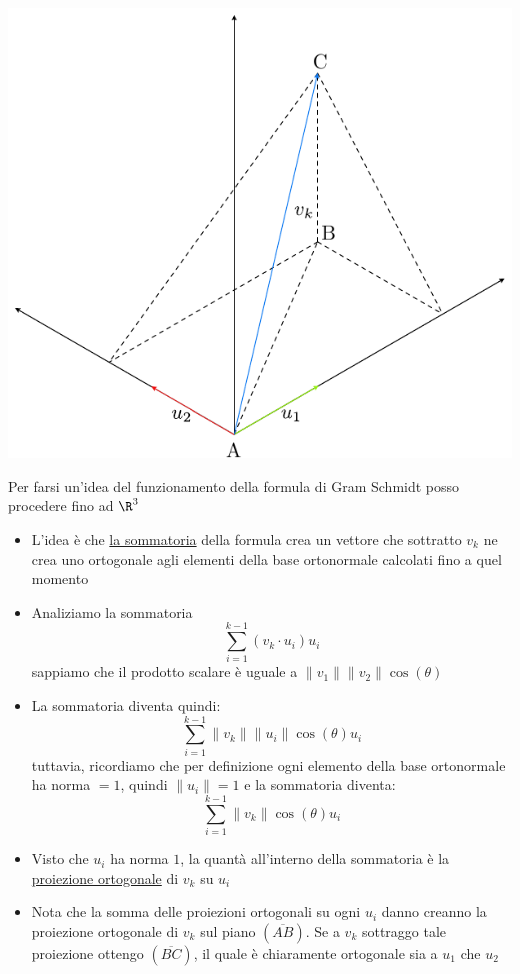 \documentclass[12pt,a4paper,oneside]{article}
\begin{document}
\begin{center}
	\includegraphics{Images/Gram scmidt.pdf}
\end{center}

Per farsi un'idea del funzionamento della formula di Gram Schmidt posso procedere fino ad $ \R^{3} $
\begin{itemize}
	\item L'idea è che \underline{la sommatoria} della formula crea un vettore che sottratto $ v_k $ ne crea uno ortogonale agli elementi della base ortonormale calcolati fino a quel momento
	\item Analiziamo la sommatoria
	      \[
		      \sum_{i=1}^{k-1}\left(v_k \cdot u_i\right) u_i
	      \]
	      sappiamo che il prodotto scalare è uguale a $ \|v_1\|\|v_2\| \cos \left( \theta  \right)  $
	\item La sommatoria diventa quindi:
	      \[
		      \sum_{i=1}^{k-1}\|v_k\| \|u_i\| \cos \left( \theta  \right)  u_i
	      \]
	      tuttavia, ricordiamo che per definizione ogni elemento della base ortonormale ha norma $ =1 $, quindi $ \|u_i\|=1 $ e la sommatoria diventa:
	      \[
		      \sum_{i=1}^{k-1}\|v_k\|  \cos \left( \theta  \right)  u_i
	      \]
	\item Visto che $ u_i $ ha norma $ 1 $, la quantà all'interno della sommatoria è la \underline{proiezione ortogonale} di $ v_k $ su $ u_i $
	\item Nota che la somma delle proiezioni ortogonali su ogni $ u_i $ danno creanno la proiezione ortogonale di $ v_k $ sul piano $ \left( \overline{AB} \right)  $. Se a $ v_k$ sottraggo tale proiezione ottengo $ \left( \overline{BC} \right)  $, il quale è chiaramente ortogonale sia a $ u_1 $ che $ u_2 $
\end{itemize}
\end{document}
